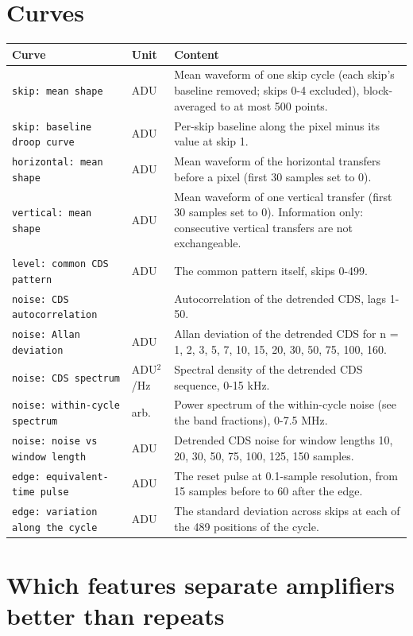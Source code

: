 \documentclass[10pt]{article}
\begin{document}
\section{Curves}
\begin{longtable}{>{\raggedright\arraybackslash}p{}>{\raggedright\arraybackslash}p{}>{\raggedright\arraybackslash}p{}}
\toprule Curve & Unit & Content \\ \midrule \endhead
\bottomrule \endfoot
\texttt{skip: mean shape} & ADU & Mean waveform of one skip cycle (each skip's baseline removed; skips 0-4 excluded), block-averaged to at most 500 points. \\
\texttt{skip: baseline droop curve} & ADU & Per-skip baseline along the pixel minus its value at skip 1. \\
\texttt{horizontal: mean shape} & ADU & Mean waveform of the horizontal transfers before a pixel (first 30 samples set to 0). \\
\texttt{vertical: mean shape} & ADU & Mean waveform of one vertical transfer (first 30 samples set to 0). Information only: consecutive vertical transfers are not exchangeable. \\
\texttt{level: common CDS pattern} & ADU & The common pattern itself, skips 0-499. \\
\texttt{noise: CDS autocorrelation} &  & Autocorrelation of the detrended CDS, lags 1-50. \\
\texttt{noise: Allan deviation} & ADU & Allan deviation of the detrended CDS for n = 1, 2, 3, 5, 7, 10, 15, 20, 30, 50, 75, 100, 160. \\
\texttt{noise: CDS spectrum} & ADU$^{2}$/Hz & Spectral density of the detrended CDS sequence, 0-15 kHz. \\
\texttt{noise: within-cycle spectrum} & arb. & Power spectrum of the within-cycle noise (see the band fractions), 0-7.5 MHz. \\
\texttt{noise: noise vs window length} & ADU & Detrended CDS noise for window lengths 10, 20, 30, 50, 75, 100, 125, 150 samples. \\
\texttt{edge: equivalent-time pulse} & ADU & The reset pulse at 0.1-sample resolution, from 15 samples before to 60 after the edge. \\
\texttt{edge: variation along the cycle} & ADU & The standard deviation across skips at each of the 489 positions of the cycle. \\
\end{longtable}

\section{Which features separate amplifiers better than repeats}
\end{document}
